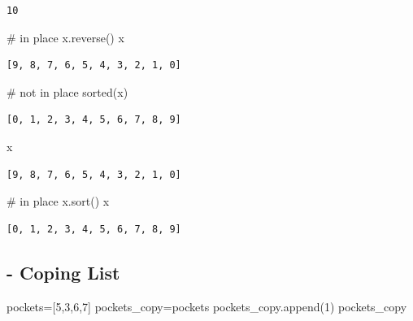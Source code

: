 \documentclass[
  a4paper,
  DIV=11,
  numbers=noendperiod]{scrreprt}
\newenvironment{Shaded}{\begin{snugshade}}{\end{snugshade}}
\newcommand{\BuiltInTok}[1]{\textcolor[rgb]{0.00,0.23,0.31}{#1}}
\newcommand{\CommentTok}[1]{\textcolor[rgb]{0.37,0.37,0.37}{#1}}
\newcommand{\DecValTok}[1]{\textcolor[rgb]{0.68,0.00,0.00}{#1}}
\newcommand{\NormalTok}[1]{\textcolor[rgb]{0.00,0.23,0.31}{#1}}
\newcommand{\OperatorTok}[1]{\textcolor[rgb]{0.37,0.37,0.37}{#1}}
\begin{document}
\begin{verbatim}
10
\end{verbatim}

\begin{Shaded}
\begin{Highlighting}[]
\CommentTok{\# in place}
\NormalTok{x.reverse()}
\NormalTok{x}
\end{Highlighting}
\end{Shaded}

\begin{verbatim}
[9, 8, 7, 6, 5, 4, 3, 2, 1, 0]
\end{verbatim}

\begin{Shaded}
\begin{Highlighting}[]
\CommentTok{\# not in place}
\BuiltInTok{sorted}\NormalTok{(x)}
\end{Highlighting}
\end{Shaded}

\begin{verbatim}
[0, 1, 2, 3, 4, 5, 6, 7, 8, 9]
\end{verbatim}

\begin{Shaded}
\begin{Highlighting}[]
\NormalTok{x}
\end{Highlighting}
\end{Shaded}

\begin{verbatim}
[9, 8, 7, 6, 5, 4, 3, 2, 1, 0]
\end{verbatim}

\begin{Shaded}
\begin{Highlighting}[]
\CommentTok{\# in place}
\NormalTok{x.sort()}
\NormalTok{x}
\end{Highlighting}
\end{Shaded}

\begin{verbatim}
[0, 1, 2, 3, 4, 5, 6, 7, 8, 9]
\end{verbatim}

\subsection{- Coping List}\label{coping-list}

\begin{Shaded}
\begin{Highlighting}[]
\NormalTok{pockets}\OperatorTok{=}\NormalTok{[}\DecValTok{5}\NormalTok{,}\DecValTok{3}\NormalTok{,}\DecValTok{6}\NormalTok{,}\DecValTok{7}\NormalTok{]}
\NormalTok{pockets\_copy}\OperatorTok{=}\NormalTok{pockets}
\NormalTok{pockets\_copy.append(}\DecValTok{1}\NormalTok{)}
\NormalTok{pockets\_copy}
\end{Highlighting}
\end{Shaded}
\end{document}
